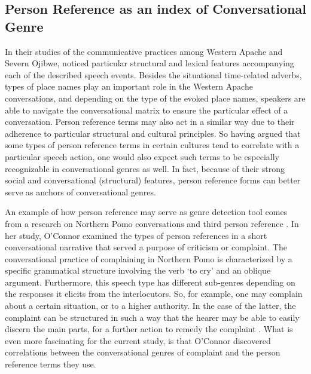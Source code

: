 \documentclass[12pt]{article}
\begin{document}
\subsection{Person Reference as an index of Conversational Genre}
In their studies of the communicative practices among Western Apache and Severn Ojibwe, \textcite{basso1996,basso1990,valentine1995,samuels2004} noticed particular structural and lexical features accompanying each of the described speech events. Besides the situational time-related adverbs, types of place names play an important role in the Western Apache conversations, and depending on the type of the evoked place names, speakers are able to navigate the conversational matrix to ensure the particular effect of a conversation. Person reference terms may also act in a similar way due to their adherence to particular structural and cultural principles. So having argued that some types of person reference terms in certain cultures tend to correlate with a particular speech action, one would also expect such terms to be especially recognizable in conversational genres as well. In fact, because of their strong social and conversational (structural) features, person reference forms can better serve as anchors of conversational genres.

An example of how person reference may serve as genre detection tool comes from a research on Northern Pomo conversations and third person reference \parencite{oconnor1990}. In her study, O'Connor examined the types of person references in a short conversational narrative that served a purpose of criticism or complaint. The conversational  practice of complaining in Northern Pomo is characterized by a specific grammatical structure involving the verb `to cry' and an oblique argument. Furthermore, this speech type has different sub-genres depending on the responses it elicits from the interlocutors. So, for example, one may complain  about a certain situation, or to a higher authority. In the case of the latter, the complaint can be structured in such a way that the hearer may be able to easily discern the main parts, for a further action to remedy the complaint \parencite[p. 381]{oconnor1990}. What is even more fascinating for the current study, is that O'Connor discovered correlations between the conversational genres of complaint and the person reference terms they use. 
\end{document}
